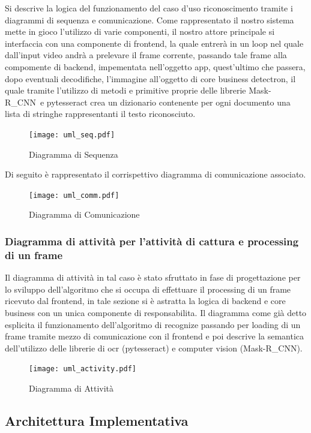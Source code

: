 \documentclass[12pt,a4paper]{article}
\newcommand{\mrcnn}{Mask-R\_CNN}
\begin{document}
Si descrive la logica del funzionamento del caso d'uso riconoscimento
tramite i diagrammi di sequenza e comunicazione.
Come rappresentato il nostro sistema mette in gioco l'utilizzo di varie
componenti, il nostro attore principale si interfaccia con una
componente di frontend, la quale entrerà in un loop nel quale dall'input
video andrà a prelevare il frame corrente, passando tale frame alla
compomente di backend, impementata nell'oggetto app, quest'ultimo che
passera, dopo eventuali decodifiche, l'immagine all'oggetto di core
business detectron, il quale tramite l'utilizzo di metodi e primitive
proprie delle librerie \mrcnn\ e pytesseract crea un dizionario
contenente per ogni documento una lista di stringhe rappresentanti il
testo riconosciuto.

\begin{figure}[H]
    \caption{Diagramma di Sequenza}
    \centering
    \texttt{[image: uml\_seq.pdf]}
\end{figure}

Di seguito è rappresentato il corrispettivo diagramma di comunicazione
associato.

\begin{figure}[H]
    \caption{Diagramma di Comunicazione}
    \centering
    \texttt{[image: uml\_comm.pdf]}
\end{figure}

\subsubsection{Diagramma di attività per l'attività di cattura e processing di un
frame}

Il diagramma di attività in tal caso è stato sfruttato in fase di progettazione
per lo sviluppo dell'algoritmo che si occupa di effettuare il processing di un
frame ricevuto dal frontend, in tale sezione si è astratta la logica di backend
e core business con un unica componente di responsabilita. Il diagramma come
già detto esplicita il funzionamento dell'algoritmo di recognize passando per
loading di un frame tramite mezzo di comunicazione  con il frontend e poi
descrive la semantica dell'utilizzo delle librerie di ocr (pytesseract) e
computer vision (\mrcnn).

\begin{figure}[p]
    \caption{Diagramma di Attività}
    \centering
    \texttt{[image: uml\_activity.pdf]}
\end{figure}

\pagebreak

\subsection{Architettura Implementativa}
\end{document}
